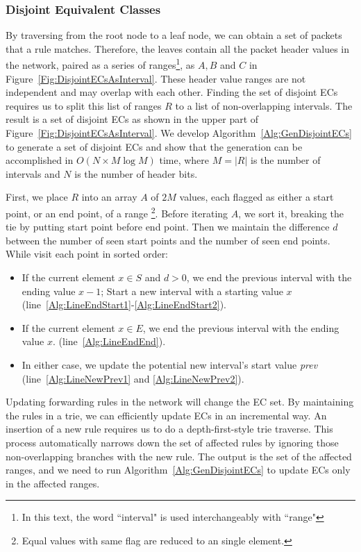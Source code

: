
\subsubsection{Disjoint Equivalent Classes}
By traversing from the root node to a leaf node, we can obtain a set of packets that a rule matches.
Therefore, the leaves contain all the packet header values in the network,
paired as a series of ranges\footnote{In this text, the word ``interval" is used interchangeably with ``range"},
as $A, B$ and $C$ in Figure~\ref{Fig:DisjointECsAsInterval}.
These header value ranges are not independent and may overlap with each other.
Finding the set of disjoint ECs requires us to split this list of ranges $R$ to a list of non-overlapping intervals. The result is a set of disjoint ECs as shown in the upper part of Figure~\ref{Fig:DisjointECsAsInterval}. 
We develop Algorithm~\ref{Alg:GenDisjointECs} to generate a set of disjoint ECs and show that the generation can be accomplished in $O(N \times M\log M)$ time,
where $M=|R|$ is the number of intervals and $N$ is the number of header bits.

First, we place $R$ into an array $A$ of $2M$ values,
each flagged as either a start point, or an end point, of a range
\footnote{Equal values with same flag are reduced to an single element.}.
Before iterating $A$, we sort it, breaking the tie by putting start point before end point.
Then we maintain the difference $d$ between the number of seen start points and
the number of seen end points. While visit each point in sorted order:
\begin{itemize}
\item If the current element $x \in S$ and $d > 0$,
        we end the previous interval with the ending value $x - 1$;
        Start a new interval with a starting value $x$
        (line~\ref{Alg:LineEndStart1}-\ref{Alg:LineEndStart2}).
\item If the current element $x \in E$, we end the previous interval with the ending value $x$.
        (line~\ref{Alg:LineEndEnd}).
\item In either case, we update the potential new interval's start value \textit{prev}
        (line~\ref{Alg:LineNewPrev1} and \ref{Alg:LineNewPrev2}).
\end{itemize}

Updating forwarding rules in the network will change the EC set.
By maintaining the rules in a trie, we can efficiently update ECs in an incremental way. An insertion of a new rule requires us to do a depth-first-style trie traverse. This process automatically narrows down the set of affected rules by ignoring those non-overlapping branches with the new rule.
The output is the set of the affected ranges, and we need to run Algorithm~\ref{Alg:GenDisjointECs} to update ECs only in the affected ranges.


